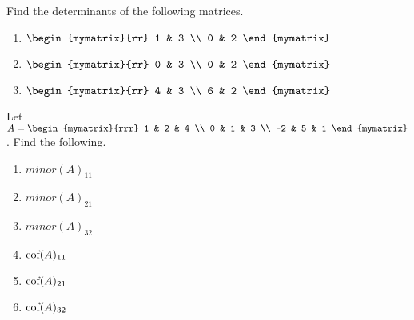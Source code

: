 \begin{enumialphparenastyle}

\begin{ex} Find the determinants of the following matrices.

\begin{enumerate}
\item $\begin{mymatrix}{rr}
1 & 3 \\
0 & 2
\end{mymatrix}$

\item $\begin{mymatrix}{rr}
0 & 3 \\
0 & 2
\end{mymatrix}$

\item $\begin{mymatrix}{rr}
4 & 3 \\
6 & 2
\end{mymatrix}$
\end{enumerate}
\end{ex}

\begin{ex} Let $A = \begin{mymatrix}{rrr}
1 & 2 & 4 \\
0 & 1 & 3 \\
-2 & 5 & 1 
\end{mymatrix}$. Find the following.
\begin{enumerate}
\item $minor(A)_{11}$
\item $minor(A)_{21}$
\item $minor(A)_{32}$
\item $\mbox{cof}(A)_{11}$
\item $\mbox{cof}(A)_{21}$
\item $\mbox{cof}(A)_{32}$
\end{enumerate}
\end{ex}


\end{enumialphparenastyle}
